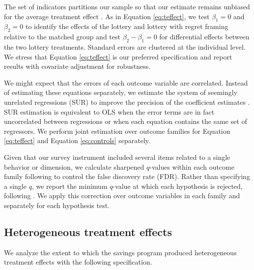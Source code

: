 \documentclass[11pt]{article}
\begin{document}
		The set of indicators partitions our sample so that our estimate remains unbiased for the average treatment effect . As in Equation \ref{eq:teffect}, we test $\beta_{1} = 0$ and $\beta_{2} = 0$ to identify the effects of the lottery and lottery with regret framing relative to the matched group and test $\beta_{2} - \beta_{1} = 0$ for differential effects between the two lottery treatments. Standard errors are clustered at the individual level. We stress that Equation \ref{eq:teffect} is our preferred specification and report results with covariate adjustment for robustness.

		We might expect that the errors of each outcome variable are correlated. Instead of estimating these equations separately, we estimate the system of seemingly unrelated regressions (SUR) to improve the precision of the coefficient estimates . SUR estimation is equivalent to OLS when the error terms are in fact uncorrelated between regressions or when each equation contains the same set of regressors. We perform joint estimation over outcome families for Equation \ref{eq:teffect} and Equation \ref{eq:controls} separately.

		Given that our survey instrument included several items related to a single behavior or dimension, we calculate sharpened $q$-values within each outcome family following  to control the false discovery rate (FDR). Rather than specifying a single $q$, we report the minimum $q$-value at which each hypothesis is rejected, following . We apply this correction over outcome variables in each family and separately for each hypothesis test.


	\subsection{Heterogeneous treatment effects}

		We analyze the extent to which the savings program produced heterogeneous treatment effects with the following specification.
\end{document}
